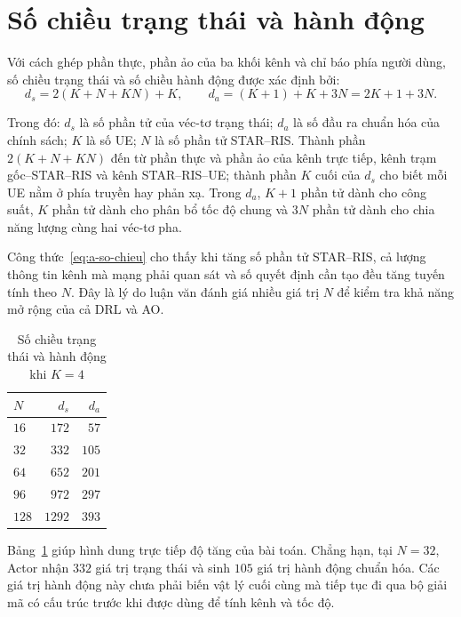 \section{Số chiều trạng thái và hành động}
\label{sec:so-chieu}

Với cách ghép phần thực, phần ảo của ba khối kênh và chỉ báo phía người dùng, số chiều
trạng thái và số chiều hành động được xác định bởi:
\begin{equation}
\label{eq:a-so-chieu}
d_s = 2(K + N + KN) + K,
\qquad
d_a = (K+1) + K + 3N = 2K + 1 + 3N.
\end{equation}

Trong đó: $d_s$ là số phần tử của véc-tơ trạng thái; $d_a$ là số đầu ra chuẩn hóa của
chính sách; $K$ là số UE; $N$ là số phần tử STAR--RIS. Thành phần $2(K + N + KN)$ đến từ
phần thực và phần ảo của kênh trực tiếp, kênh trạm gốc--STAR--RIS và kênh STAR--RIS--UE;
thành phần $K$ cuối của $d_s$ cho biết mỗi UE nằm ở phía truyền hay phản xạ. Trong $d_a$,
$K+1$ phần tử dành cho công suất, $K$ phần tử dành cho phân bổ tốc độ chung và $3N$ phần
tử dành cho chia năng lượng cùng hai véc-tơ pha.

Công thức~\eqref{eq:a-so-chieu} cho thấy khi tăng số phần tử STAR--RIS, cả lượng thông tin
kênh mà mạng phải quan sát và số quyết định cần tạo đều tăng tuyến tính theo $N$. Đây là
lý do luận văn đánh giá nhiều giá trị $N$ để kiểm tra khả năng mở rộng của cả DRL và AO.

\begin{table}[htbp]
\centering
\caption{Số chiều trạng thái và hành động khi $K = 4$}
\label{tab:a-so-chieu}
\footnotesize
\begin{tabular}{@{}lrr@{}}
\toprule
$N$ & $d_s$ & $d_a$ \\
\midrule
$16$  & $172$  & $57$  \\
$32$  & $332$  & $105$ \\
$64$  & $652$  & $201$ \\
$96$  & $972$  & $297$ \\
$128$ & $1292$ & $393$ \\
\bottomrule
\end{tabular}
\end{table}

Bảng~\ref{tab:a-so-chieu} giúp hình dung trực tiếp độ tăng của bài toán. Chẳng hạn, tại
$N = 32$, Actor nhận $332$ giá trị trạng thái và sinh $105$ giá trị hành động chuẩn hóa.
Các giá trị hành động này chưa phải biến vật lý cuối cùng mà tiếp tục đi qua bộ giải mã có
cấu trúc trước khi được dùng để tính kênh và tốc độ.

